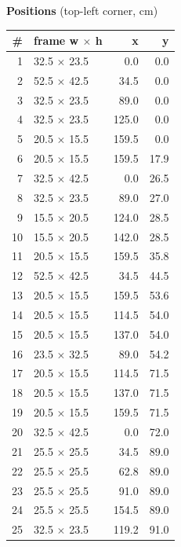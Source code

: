 \documentclass[a4paper,landscape,10pt]{article}
\begin{document}
\begin{minipage}[t]{0.25\textwidth}
\vspace{8pt}
{\bfseries Positions} (top-left corner, cm)\\[2pt]
\tiny
\begin{tabular}{@{}r l r r@{}}
\toprule
\# & frame w $\times$ h & x & y \\
\midrule
1 & 32.5 $\times$ 23.5 & 0.0 & 0.0 \\
2 & 52.5 $\times$ 42.5 & 34.5 & 0.0 \\
3 & 32.5 $\times$ 23.5 & 89.0 & 0.0 \\
4 & 32.5 $\times$ 23.5 & 125.0 & 0.0 \\
5 & 20.5 $\times$ 15.5 & 159.5 & 0.0 \\
6 & 20.5 $\times$ 15.5 & 159.5 & 17.9 \\
7 & 32.5 $\times$ 42.5 & 0.0 & 26.5 \\
8 & 32.5 $\times$ 23.5 & 89.0 & 27.0 \\
9 & 15.5 $\times$ 20.5 & 124.0 & 28.5 \\
10 & 15.5 $\times$ 20.5 & 142.0 & 28.5 \\
11 & 20.5 $\times$ 15.5 & 159.5 & 35.8 \\
12 & 52.5 $\times$ 42.5 & 34.5 & 44.5 \\
13 & 20.5 $\times$ 15.5 & 159.5 & 53.6 \\
14 & 20.5 $\times$ 15.5 & 114.5 & 54.0 \\
15 & 20.5 $\times$ 15.5 & 137.0 & 54.0 \\
16 & 23.5 $\times$ 32.5 & 89.0 & 54.2 \\
17 & 20.5 $\times$ 15.5 & 114.5 & 71.5 \\
18 & 20.5 $\times$ 15.5 & 137.0 & 71.5 \\
19 & 20.5 $\times$ 15.5 & 159.5 & 71.5 \\
20 & 32.5 $\times$ 42.5 & 0.0 & 72.0 \\
21 & 25.5 $\times$ 25.5 & 34.5 & 89.0 \\
22 & 25.5 $\times$ 25.5 & 62.8 & 89.0 \\
23 & 25.5 $\times$ 25.5 & 91.0 & 89.0 \\
24 & 25.5 $\times$ 25.5 & 154.5 & 89.0 \\
25 & 32.5 $\times$ 23.5 & 119.2 & 91.0 \\
\bottomrule
\end{tabular}
\end{minipage}
\clearpage
\end{document}
